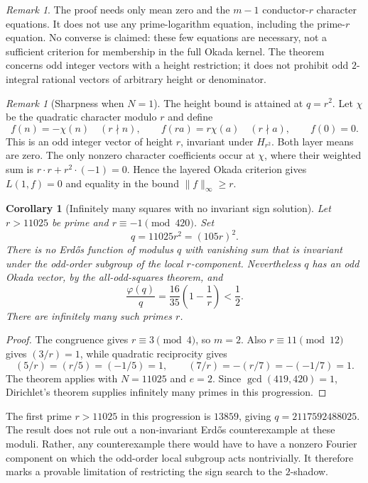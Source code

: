 \documentclass[11pt]{amsart}
\newtheorem{corollary}[theorem]{Corollary}
\theoremstyle{definition}
\theoremstyle{remark}
\newtheorem{remark}[theorem]{Remark}
\numberwithin{equation}{section}
\begin{document}
\begin{remark}
The proof needs only mean zero and the $m-1$ conductor-$r$ character
equations.  It does not use any prime-logarithm equation, including
the prime-$r$ equation.  No converse is claimed: these few equations are necessary,
not a sufficient criterion for membership in the full Okada kernel.
The theorem concerns odd integer vectors with a height restriction;
it does not prohibit odd $2$-integral rational vectors of arbitrary
height or denominator.
\end{remark}

\begin{remark}[Sharpness when $N=1$]
The height bound is attained at $q=r^2$.  Let $\chi$ be the quadratic
character modulo $r$ and define
\[
 f(n)=-\chi(n)\quad(r\nmid n),\qquad
 f(ra)=r\chi(a)\quad(r\nmid a),\qquad f(0)=0.
\]
This is an odd integer vector of height $r$, invariant under
$H_{r^2}$.  Both layer means are zero.  The only nonzero character
coefficients occur at $\chi$, where their weighted sum is
$r\cdot r+r^2\cdot(-1)=0$.  Hence the layered Okada criterion gives
$L(1,f)=0$ and equality in the bound $\lVert f\rVert_\infty\geq r$.
\end{remark}

\begin{corollary}[Infinitely many squares with no invariant sign solution]
Let $r>11025$ be prime and $r\equiv-1\pmod {420}$.  Set
\[
 q=11025r^2=(105r)^2.
\]
There is no Erd\H{o}s function of modulus $q$ with vanishing sum that is
invariant under the odd-order subgroup of the local $r$-component.
Nevertheless $q$ has an odd Okada vector, by the all-odd-squares theorem,
and
\[
 \frac{\varphi(q)}q=\frac{16}{35}\left(1-\frac1r\right)<\frac12.
\]
There are infinitely many such primes $r$.
\end{corollary}

\begin{proof}
The congruence gives $r\equiv3\pmod4$, so $m=2$.  Also
$r\equiv11\pmod {12}$ gives $(3/r)=1$, while quadratic reciprocity gives
\[
 (5/r)=(r/5)=(-1/5)=1,\qquad
 (7/r)=-(r/7)=-(-1/7)=1.
\]
The theorem applies with $N=11025$ and $e=2$.  Since
$\gcd(419,420)=1$, Dirichlet's theorem supplies infinitely many primes
in this progression.
\end{proof}

The first prime $r>11025$ in this progression is $13859$, giving
$q=2117592488025$.  The result does not rule out a non-invariant
Erd\H{o}s counterexample at these moduli.  Rather, any counterexample
there would have to have a nonzero Fourier component on which the
odd-order local subgroup acts nontrivially.  It therefore marks a
provable limitation of restricting the sign search to the $2$-shadow.
\end{document}
